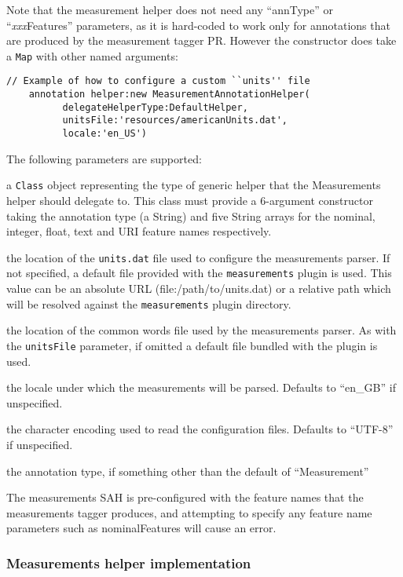 Note that the measurement helper does not need any ``annType'' or
``{\em xxx}Features'' parameters, as it is hard-coded to work only for
annotations that are produced by the measurement tagger PR.  However the
constructor does take a {\tt Map} with other named arguments:
\begin{lstlisting}[firstnumber=6,texcl]
    // Example of how to configure a custom ``units'' file
    annotation helper:new MeasurementAnnotationHelper(
          delegateHelperType:DefaultHelper,
          unitsFile:'resources/americanUnits.dat',
          locale:'en_US')
\end{lstlisting}

The following parameters are supported:
\bde
\item[delegateHelperType (required)] a {\tt Class} object representing the type
  of generic helper that the Measurements helper should delegate to.  This
  class must provide a 6-argument constructor taking the annotation type (a
  String) and five String arrays for the nominal, integer, float, text and URI
  feature names respectively.
\item[unitsFile] the location of the {\tt units.dat} file used to configure the
  measurements parser.  If not specified, a default file provided with the
  {\tt measurements} plugin is used.  This value can be an absolute URL
  (file:/path/to/units.dat) or a relative path which will be resolved against
  the {\tt measurements} plugin directory.
\item[commonWords] the location of the common words file used by the
  measurements parser.  As with the {\tt unitsFile} parameter, if omitted a
  default file bundled with the plugin is used.
\item[locale] the locale under which the measurements will be parsed.  Defaults
  to ``en\_GB'' if unspecified.
\item[encoding] the character encoding used to read the configuration files.
  Defaults to ``UTF-8'' if unspecified.
\item[annType] the annotation type, if something other than the default of
  ``Measurement''
\ede

The measurements SAH is pre-configured with the feature names that the
measurements tagger produces, and attempting to specify any feature name
parameters such as nominalFeatures will cause an error.

\subsubsection{Measurements helper implementation}

